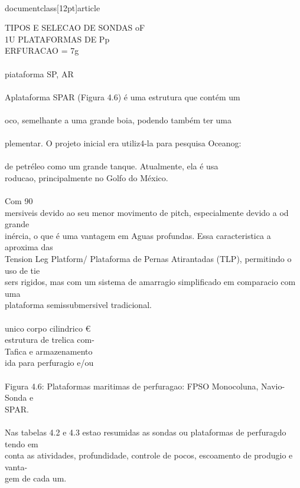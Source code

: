 \\documentclass[12pt]{article}
\begin{document}
TIPOS E SELECAO DE SONDAS oF\\
1U PLATAFORMAS DE Pp\\
ERFURACAO = 7g\\
\\
piataforma SP, AR\\
\\
Aplataforma SPAR (Figura 4.6) é uma estrutura que contém um\\
\\
oco, semelhante a uma grande boia, podendo também ter uma\\
\\
plementar. O projeto inicial era utiliz4-la para pesquisa Oceanog:\\
\\
de petréleo como um grande tanque. Atualmente, ela é usa\\
roducao, principalmente no Golfo do México.\\
\\
Com 90\\%
mersiveis devido ao seu menor movimento de pitch, especialmente devido a od grande\\
inércia, o que é uma vantagem em Aguas profundas. Essa caracteristica a aproxima das\\
Tension Leg Platform/ Plataforma de Pernas Atirantadas (TLP), permitindo o uso de tie\\
sers rigidos, mas com um sistema de amarragio simplificado em comparacio com uma\\
plataforma semissubmersivel tradicional.\\
\\
unico corpo cilindrico €\\
estrutura de trelica com-\\
Tafica e armazenamento\\
ida para perfuragio e/ou\\
\\
Figura 4.6: Plataformas maritimas de perfuragao: FPSO Monocoluna, Navio-Sonda e\\
SPAR.\\
\\
Nas tabelas 4.2 e 4.3 estao resumidas as sondas ou plataformas de perfuragdo tendo em\\
conta as atividades, profundidade, controle de pocos, escoamento de produgio e vanta-\\
gem de cada um.\\
\end{document}
